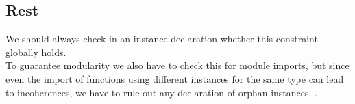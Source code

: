 



\subsection{Rest}
We should always check in an instance declaration whether this constraint globally holds. \\
To guarantee modularity we also have to check this for module imports, but since even the import of functions using different instances for the same type can lead to incoherences, we have to rule out any declaration of orphan instances.
\cite{Kilpatrick2019-cy}.